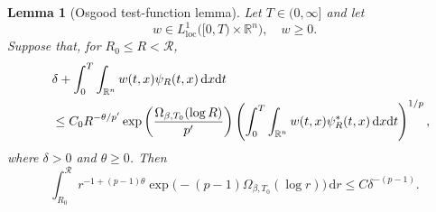 \documentclass[11pt,reqno]{amsart}
\newtheorem{lemma}[theorem]{Lemma}
\theoremstyle{definition}
\theoremstyle{remark}
\begin{document}
	\begin{lemma}[Osgood test-function lemma]
		\label{lem:osgood}
		Let $T\in(0,\infty]$ and let
		$$
		w\in L^1_{\mathrm{loc}}
		\bigl([0,T)\times\mathbb{R}^n\bigr), \quad w\geq0.
		$$
		Suppose that, for $R_0\leq R<\mathcal{R}$,
		\begin{align}
			\label{eq:osgood-ass}
			&\delta+\int_0^T\int_{\mathbb{R}^n}w(t,x)\psi_R(t,x)\,\mathrm{d}x\mathrm{d}t \notag\\
			\quad&\leq C_0R^{-\theta/p'}
			\exp\left(\frac{\Omega_{\beta,T_0}(\log R)}{p'}\right)\left(\int_0^T\int_{\mathbb{R}^n} w(t,x)\psi_R^*(t,x)\,\mathrm{d}x\mathrm{d}t
			\right)^{1/p},
		\end{align}
		where $\delta>0$ and $\theta\geq0$. Then
		\begin{equation}
			\label{eq:osgood-concl}
			\int_{R_0}^{\mathcal{R}}
			r^{-1+(p-1)\theta}
			\exp\bigl(
			-(p-1)\Omega_{\beta,T_0}(\log r)
			\bigr)\,\mathrm{d}r
			\leq
			C\delta^{-(p-1)}.
		\end{equation}
	\end{lemma}
	
\end{document}
